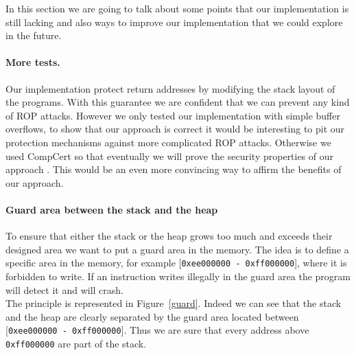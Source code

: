 \documentclass[11pt]{sdm}
\begin{document}
In this section we are going to talk about some points that our implementation is still lacking and also ways to improve our implementation that we could explore in the future.

\paragraph{More tests.}
\label{par:More tests}
Our implementation protect return addresses by modifying the stack layout of the programs. With this guarantee we are confident that we can prevent any kind of ROP attacks. 
However we only tested our implementation with simple buffer overflows, to show that our approach is correct it would be interesting to pit our protection mechanisms against more complicated ROP attacks. Otherwise we used CompCert so that eventually we will prove the security properties of our approach . This would be an even more convincing way to affirm the benefits of our approach.

\paragraph{Guard area between the stack and the heap}
\label{par:guard_area}
To ensure that either the stack or the heap grows too much and exceeds their designed area we want to put a guard area in the memory. The idea is to define a specific area in the memory, for example [\texttt{0xee000000 - \texttt{0xff000000}}], where it is forbidden to write. If an instruction writes illegally in the guard area the program will detect it and will crash.\\
The principle is represented in Figure~\ref{guard}. Indeed we can see that the stack and the heap are clearly separated by the guard area located between [\texttt{0xee000000 - \texttt{0xff000000}}]. Thus we are sure that every address above \texttt{0xff000000} are part of the stack.
\end{document}
